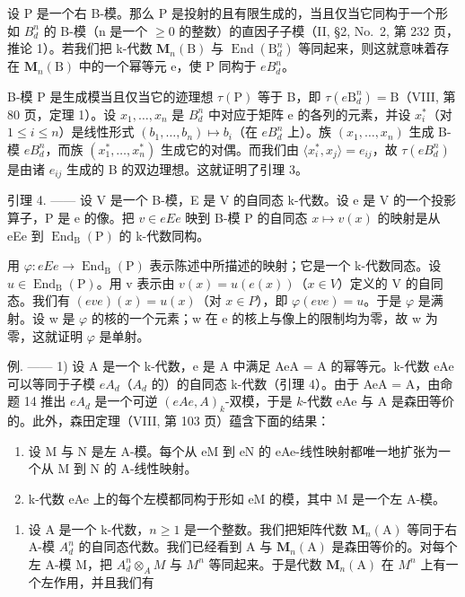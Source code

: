设 P 是一个右 B-模。那么 P 是投射的且有限生成的，当且仅当它同构于一个形如 \(B_{d}^{n}\) 的 B-模（n 是一个 \(\geqslant 0\) 的整数）的直因子子模（II, §2, No.~2, 第 232 页，推论 1）。若我们把 k-代数 \(\mathbf{M}_{n}(\mathrm{B})\) 与 \(\operatorname{End}(\mathrm{B}_{d}^{n})\) 等同起来，则这就意味着存在 \(\mathbf{M}_{n}(\mathrm{B})\) 中的一个幂等元 e，使 P 同构于 \(eB_{d}^{n}\)。

B-模 P 是生成模当且仅当它的迹理想 \(\tau(\mathrm{P})\) 等于 B，即 \(\tau(e\mathrm{B}_{d}^{n})=\mathrm{B}\)（VIII, 第 80 页，定理 1）。设 \(x_{1},\ldots,x_{n}\) 是 \(B_{d}^{n}\) 中对应于矩阵 e 的各列的元素，并设 \(x_{i}^{*}\)（对 \(1\leqslant i\leqslant n\)）是线性形式 \((b_{1},\ldots,b_{n})\mapsto b_{i}\)（在 \(eB_{d}^{n}\) 上）。族 \((x_{1},\ldots,x_{n})\) 生成 B-模 \(eB_{d}^{n}\)，而族 \((x_{1}^{*},\ldots,x_{n}^{*})\) 生成它的对偶。而我们由 \(\langle x_{i}^{*},x_{j}\rangle=e_{ij}\)，故 \(\tau(eB_{d}^{n})\) 是由诸 \(e_{ij}\) 生成的 B 的双边理想。这就证明了引理 3。

引理 4. —— 设 V 是一个 B-模，E 是 V 的自同态 k-代数。设 e 是 V 的一个投影算子，P 是 e 的像。把 \(v \in eEe\) 映到 B-模 P 的自同态 \(x \mapsto v(x)\) 的映射是从 eEe 到 \(\operatorname{End}_{\mathrm{B}}(\mathrm{P})\) 的 k-代数同构。

用 \(\varphi:eEe\to\operatorname{End}_{\mathrm{B}}(\mathrm{P})\) 表示陈述中所描述的映射；它是一个 k-代数同态。设 \(u\in\operatorname{End}_{\mathrm{B}}(\mathrm{P})\)。用 v 表示由 \(v(x)=u(e(x))\)（\(x\in V\)）定义的 V 的自同态。我们有 \((eve)(x)=u(x)\)（对 \(x\in P\)），即 \(\varphi(eve)=u\)。于是 \(\varphi\) 是满射。设 w 是 \(\varphi\) 的核的一个元素；w 在 e 的核上与像上的限制均为零，故 w 为零，这就证明 \(\varphi\) 是单射。

例. —— 1) 设 A 是一个 k-代数，e 是 A 中满足 AeA = A 的幂等元。k-代数 eAe 可以等同于子模 \(eA_{d}\)（\(A_{d}\) 的）的自同态 k-代数（引理 4）。由于 AeA = A，由命题 14 推出 \(eA_{d}\) 是一个可逆 \((eAe, A)_{k}\)-双模，于是 \(k\)-代数 eAe 与 A 是森田等价的。此外，森田定理（VIII, 第 103 页）蕴含下面的结果：

\begin{enumerate}
\def\labelenumi{\alph{enumi})}
\item
  设 M 与 N 是左 A-模。每个从 eM 到 eN 的 eAe-线性映射都唯一地扩张为一个从 M 到 N 的 A-线性映射。
\item
  k-代数 eAe 上的每个左模都同构于形如 eM 的模，其中 M 是一个左 A-模。
\end{enumerate}

\begin{enumerate}
\def\labelenumi{\arabic{enumi})}
\setcounter{enumi}{1}
\tightlist
\item
  设 A 是一个 k-代数，\(n \geqslant 1\) 是一个整数。我们把矩阵代数 \(\mathbf{M}_{n}(\mathrm{A})\) 等同于右 A-模 \(A_{d}^{n}\) 的自同态代数。我们已经看到 A 与 \(\mathbf{M}_{n}(\mathrm{A})\) 是森田等价的。对每个左 A-模 M，把 \(A_{d}^{n} \otimes_{A} M\) 与 \(M^{n}\) 等同起来。于是代数 \(\mathbf{M}_{n}(\mathrm{A})\) 在 \(M^{n}\) 上有一个左作用，并且我们有
\end{enumerate}

